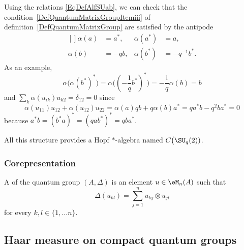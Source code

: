 Using the relations \eqref{EqDefAlfSUab}, we can check that the condition~\ref{DefQuantumMatrixGroupItemiii} of definition~\ref{DefQuantumMatrixGroup} are satisfied by the antipode
\begin{equation}
	\begin{aligned}[]
		\alpha(a) & =a^*, & \alpha(a^*) & =a,          \\
		\alpha(b) & =-qb, & \alpha(b^*) & =-q^{-1}b^*.
	\end{aligned}
\end{equation}
As an example,
\begin{equation}
	\alpha\big( \alpha(b^*)^* \big)=\alpha\big( (-\frac{1}{ q }b^*)^* \big)=-\frac{1}{ q }\alpha(b)=b
\end{equation}
and $\sum_k\alpha(u_{ik})u_{k2}=\delta_{12}=0$ since
\begin{equation}
	\alpha(u_{11})u_{12}+\alpha(u_{12})u_{22}=\alpha(a)qb+q\alpha(b)a^*=qa^*b-q^2ba^*=0
\end{equation}
because $a^*b=(b^*a)^*=(qab^*)^*=qba^*$.

All this structure provides a Hopf $*$-algebra named $C\big(\SU_q(2))$.

\subsubsection{Corepresentation}

A  of the quantum group $(A,\Delta)$ is an element $u\in\eM_n(A)$ such that
\begin{equation}
	\Delta(u_{kl})=\sum_{j=1}^nu_{kj}\otimes u_{jl}
\end{equation}
for every $k,l\in\{ 1,\ldots n \}$.

\subsection{Haar measure on compact quantum groups}

